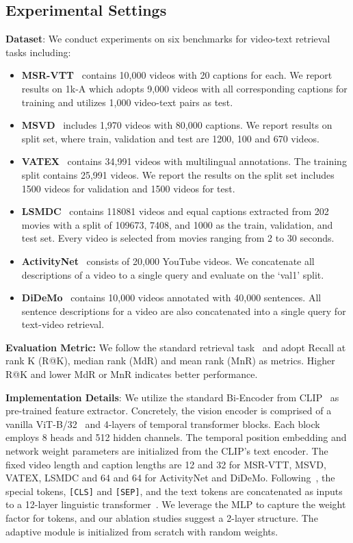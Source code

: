\documentclass[runningheads]{llncs}
\begin{document}
\subsection{Experimental Settings} 
\textbf{Dataset}: We conduct experiments on six benchmarks for video-text retrieval tasks including:
\begin{itemize}
\item \textbf{MSR-VTT}~\cite{msrvtt} contains 10,000 videos with 20 captions for each. We report results on 1k-A which adopts 9,000 videos with all corresponding captions for training and utilizes 1,000 video-text pairs as test.
\item \textbf{MSVD}~\cite{msvd} includes 1,970 videos with 80,000 captions.  We report results on split set,  where train, validation and test are 1200, 100 and 670 videos.
\item\textbf{VATEX}~\cite{vatex} contains 34,991 videos with multilingual annotations. The training split contains 25,991 videos.  We report the results on the split set includes 1500 videos for validation and 1500 videos for test. 
 \item\textbf{LSMDC}~\cite{lsmdc} contains 118081 videos and equal captions extracted from 202 movies with a split of 109673,  7408, and 1000 as the train, validation, and test set.  Every video is selected from movies ranging from 2 to 30 seconds.
 \item\textbf{ActivityNet}~\cite{anet} consists of 20,000 YouTube videos. We concatenate all descriptions of a video to a single query and evaluate on the `val1' split. 
 \item\textbf{DiDeMo}~\cite{didemo} contains 10,000 videos annotated with 40,000 sentences. All sentence descriptions for a video are also concatenated into a single query for text-video retrieval.
\end{itemize}

\noindent\textbf{Evaluation Metric:} We follow the standard retrieval task~\cite{clip4clip} and adopt Recall at rank K (R@K),  median rank (MdR) and mean rank (MnR) as metrics.  Higher R@K and lower MdR or MnR indicates better performance.

\noindent\textbf{Implementation Details}: We utilize the standard Bi-Encoder from CLIP~\cite{clip} as pre-trained feature extractor. 
Concretely, the vision encoder is comprised of a vanilla ViT-B/32~\cite{vit} and 4-layers of temporal transformer blocks. Each block employs 8 heads and 512 hidden channels. The temporal position embedding and network weight parameters are initialized from the CLIP's text encoder.
The fixed video length and caption lengths are 12 and 32 for MSR-VTT, MSVD, VATEX, LSMDC and 64 and 64 for ActivityNet and DiDeMo.
Following~\cite{clip}, the special tokens, \texttt{[CLS]} and \texttt{[SEP]}, and the text tokens are concatenated as inputs to a 12-layer linguistic transformer~\cite{bert,clip}.
We leverage the MLP to capture the weight factor for tokens, and our ablation studies suggest a 2-layer structure.
The adaptive module is initialized from scratch with random weights.
\end{document}
